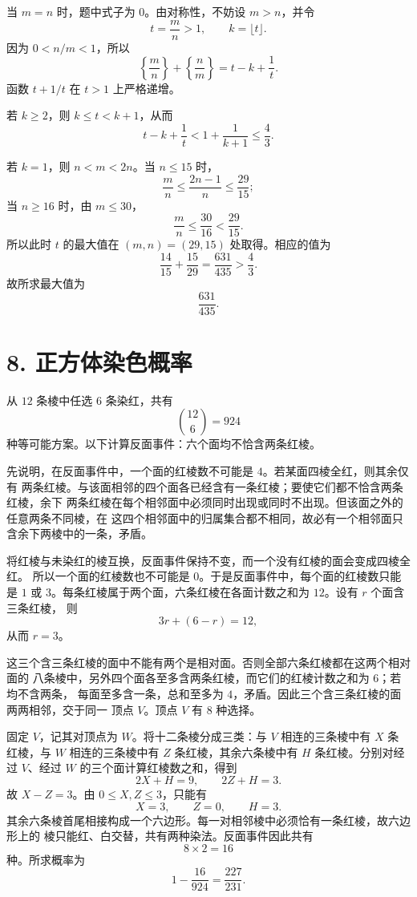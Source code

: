 \documentclass[UTF8,11pt]{ctexart}
\newcommand{\ans}[1]{\boxed{#1}}
\begin{document}
当 $m=n$ 时，题中式子为 $0$。由对称性，不妨设 $m>n$，并令
\[
  t=\frac mn>1,\qquad k=\lfloor t\rfloor.
\]
因为 $0<n/m<1$，所以
\[
  \left\{\frac mn\right\}+\left\{\frac nm\right\}
  =t-k+\frac1t.
\]
函数 $t+1/t$ 在 $t>1$ 上严格递增。

若 $k\geqslant2$，则 $k\leqslant t<k+1$，从而
\[
  t-k+\frac1t<1+\frac1{k+1}\leqslant\frac43.
\]

若 $k=1$，则 $n<m<2n$。当 $n\leqslant15$ 时，
\[
  \frac mn\leqslant\frac{2n-1}{n}\leqslant\frac{29}{15};
\]
当 $n\geqslant16$ 时，由 $m\leqslant30$，
\[
  \frac mn\leqslant\frac{30}{16}<\frac{29}{15}.
\]
所以此时 $t$ 的最大值在 $(m,n)=(29,15)$ 处取得。相应的值为
\[
  \frac{14}{15}+\frac{15}{29}=\frac{631}{435}>\frac43.
\]
故所求最大值为
\[
  \ans{\frac{631}{435}}.
\]

\section*{8. 正方体染色概率}

从 $12$ 条棱中任选 $6$ 条染红，共有
\[
  \binom{12}{6}=924
\]
种等可能方案。以下计算反面事件：六个面均不恰含两条红棱。

先说明，在反面事件中，一个面的红棱数不可能是 $4$。若某面四棱全红，则其余仅有
两条红棱。与该面相邻的四个面各已经含有一条红棱；要使它们都不恰含两条红棱，余下
两条红棱在每个相邻面中必须同时出现或同时不出现。但该面之外的任意两条不同棱，在
这四个相邻面中的归属集合都不相同，故必有一个相邻面只含余下两棱中的一条，矛盾。

将红棱与未染红的棱互换，反面事件保持不变，而一个没有红棱的面会变成四棱全红。
所以一个面的红棱数也不可能是 $0$。于是反面事件中，每个面的红棱数只能是 $1$ 或
$3$。每条红棱属于两个面，六条红棱在各面计数之和为 $12$。设有 $r$ 个面含三条红棱，
则
\[
  3r+(6-r)=12,
\]
从而 $r=3$。

这三个含三条红棱的面中不能有两个是相对面。否则全部六条红棱都在这两个相对面的
八条棱中，另外四个面各至多含两条红棱，而它们的红棱计数之和为 $6$；若均不含两条，
每面至多含一条，总和至多为 $4$，矛盾。因此三个含三条红棱的面两两相邻，交于同一
顶点 $V$。顶点 $V$ 有 $8$ 种选择。

固定 $V$，记其对顶点为 $W$。将十二条棱分成三类：与 $V$ 相连的三条棱中有 $X$ 条
红棱，与 $W$ 相连的三条棱中有 $Z$ 条红棱，其余六条棱中有 $H$ 条红棱。分别对经过
$V$、经过 $W$ 的三个面计算红棱数之和，得到
\[
  2X+H=9,\qquad 2Z+H=3.
\]
故 $X-Z=3$。由 $0\leqslant X,Z\leqslant3$，只能有
\[
  X=3,\qquad Z=0,\qquad H=3.
\]
其余六条棱首尾相接构成一个六边形。每一对相邻棱中必须恰有一条红棱，故六边形上的
棱只能红、白交替，共有两种染法。反面事件因此共有
\[
  8\times2=16
\]
种。所求概率为
\[
  1-\frac{16}{924}=\ans{\frac{227}{231}}.
\]
\end{document}
